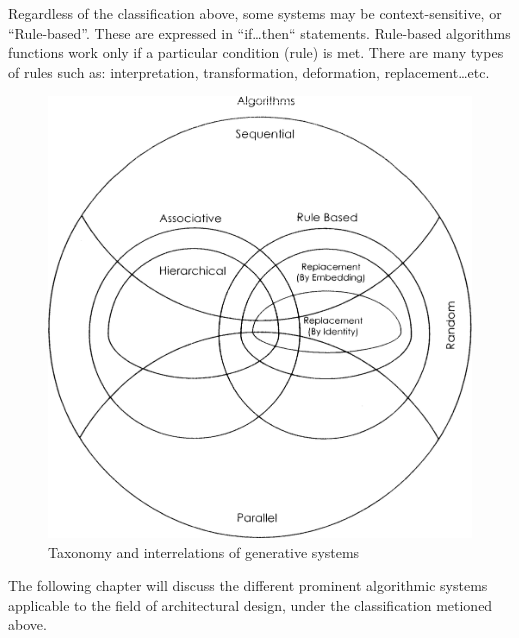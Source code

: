 Regardless of the classification above, some systems may be context-sensitive, or ``Rule-based''. These are expressed in ``if\ldots then`` statements. Rule-based algorithms functions work only if a particular condition (rule) is met. There are many types of rules such as: interpretation, transformation, deformation, replacement\ldots etc. \cite{khaldi04}

\begin{figure}[htbp]
\begin{center}
\includegraphics[width=\textwidth]{./Images/1-Taxonomy}
\end{center}
\caption[Taxonomy of Generative Systems]{Taxonomy and interrelations of generative systems \cite{khaldi04}}
\label{fig:Taxonomy}
\end{figure}

The following chapter will discuss the different prominent algorithmic systems applicable to the field of architectural design, under the classification metioned above.
